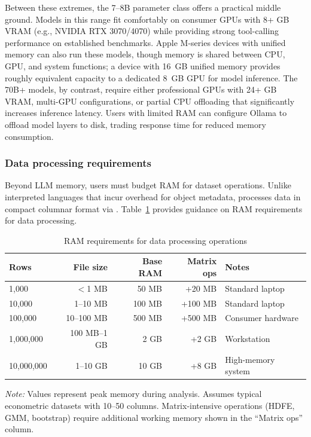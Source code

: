 Between these extremes, the 7--8B parameter class offers a practical
middle ground. Models in this range fit comfortably on consumer GPUs
with 8+ GB VRAM (e.g., NVIDIA RTX 3070/4070) while providing strong
tool-calling performance on established benchmarks. Apple M-series
devices with unified memory can also run these models, though memory
is shared between CPU, GPU, and system functions; a device with 16~GB
unified memory provides roughly equivalent capacity to a dedicated
8~GB GPU for model inference. The 70B+ models, by contrast, require either
professional GPUs with 24+ GB VRAM, multi-GPU configurations, or
partial CPU offloading that significantly increases inference latency.
Users with limited RAM can configure Ollama to offload model layers
to disk, trading response time for reduced memory consumption.

\subsubsection{Data processing requirements}

Beyond LLM memory, users must budget RAM for dataset operations. Unlike
interpreted languages that incur overhead for object metadata, 
processes data in compact columnar format via . Table~\ref{tab:hardware-data}
provides guidance on RAM requirements for data processing.

\begin{table}[htbp]
\centering
\begin{threeparttable}
\caption{RAM requirements for data processing operations}
\label{tab:hardware-data}
\small
\begin{tabular}{lrrrl}
\toprule
Rows & File size & Base RAM & Matrix ops & Notes \\
\midrule
1,000 & $<$1 MB & 50 MB & +20 MB & Standard laptop \\
10,000 & 1--10 MB & 100 MB & +100 MB & Standard laptop \\
100,000 & 10--100 MB & 500 MB & +500 MB & Consumer hardware \\
1,000,000 & 100 MB--1 GB & 2 GB & +2 GB & Workstation \\
10,000,000 & 1--10 GB & 10 GB & +8 GB & High-memory system \\
\bottomrule
\end{tabular}
\begin{tablenotes}\small
\item \emph{Note:} Values represent peak memory during analysis. Assumes
typical econometric datasets with 10--50 columns. Matrix-intensive operations
(HDFE, GMM, bootstrap) require additional working memory shown in the
``Matrix ops'' column.
\end{tablenotes}
\end{threeparttable}
\end{table}

